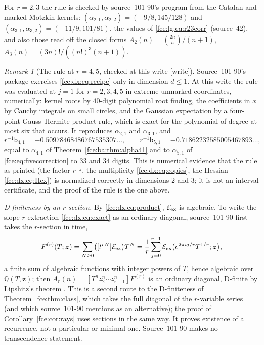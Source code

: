 \documentclass[11pt,a4paper]{article}
\numberwithin{equation}{section}
\theoremstyle{definition}\newtheorem{definition}[theorem]{Definition}
\theoremstyle{remark}\newtheorem{remark}[theorem]{Remark}
\newcommand{\Q}{\mathbb Q}
\newcommand{\E}{\mathcal E}
\begin{document}
For $r=2,3$ the rule is checked by source~101-90's program from the Catalan
and marked Motzkin kernels:
$(\alpha_{2,1},\alpha_{2,2})=(-9/8,145/128)$ and
$(\alpha_{3,1},\alpha_{3,2})=(-11/9,101/81)$, the values of
\eqref{fce:lg:eq:r23corr} (source~42), and also those read off the closed forms
$A_2(n)=\binom{2n}n/(n+1)$, $A_3(n)=(3n)!/((n!)^3(n+1))$.

\begin{remark}[The rule at $r=4,5$, checked at this write \textup{[write]}]\label{fce:dx:rem:recipecheck}
Source~101-90's package exercises \eqref{fce:dx:eq:recipe} only in dimension
$d\le1$. At this write the rule was evaluated at $j=1$ for $r=2,3,4,5$ in
extreme-unmarked coordinates, numerically: kernel roots by
$40$-digit polynomial root finding, the coefficients in $x$ by Cauchy
integrals on small circles, and the Gaussian expectation by a four-point
Gauss--Hermite product rule, which is exact for the polynomial of degree at
most six that occurs. It reproduces $\alpha_{2,1}$ and $\alpha_{3,1}$, and
\[
 r^{-1}\mathsf b_{4,1}=-0.50978468486767535307\ldots,\qquad
 r^{-1}\mathsf b_{5,1}=-0.71862232585005467893\ldots,
\]
equal to $\alpha_{4,1}$ of Theorem~\ref{fce:ba:thm:alpha41} and to
$\alpha_{5,1}$ of \eqref{fce:eq:fivecorrection} to $33$ and $34$ digits. This
is numerical evidence that the rule as printed (the factor $r^{-j}$, the
multiplicity \eqref{fce:dx:eq:copies}, the Hessian \eqref{fce:dx:eq:Hex}) is
normalized correctly in dimensions $2$ and $3$; it is not an interval
certificate, and the proof of the rule is the one above.
\end{remark}

\emph{D-finiteness by an $r$-section.} By \eqref{fce:dx:eq:product},
$\E_{\rm ex}$ is algebraic. To write the slope-$r$ extraction
\eqref{fce:dx:eq:exact} as an ordinary diagonal, source~101-90 first takes the
$r$-section in time,
\begin{equation}\label{fce:dx:eq:rsection}
 F^{(r)}(T;\boldsymbol z)=\sum_{N\ge0}\bigl([t^{rN}]\E_{\rm ex}\bigr)T^N
 =\frac1r\sum_{j=0}^{r-1}\E_{\rm ex}\bigl(e^{2\pi ij/r}T^{1/r};\boldsymbol z\bigr),
\end{equation}
a finite sum of algebraic functions with integer powers of $T$, hence
algebraic over $\Q(T,\boldsymbol z)$; then
$A_r(n)=[T^nz_2^n\cdots z_{r-1}^n]F^{(r)}$ is an ordinary diagonal, D-finite
by Lipshitz's theorem \cite{lipshitz}. This is a second route to the
D-finiteness of Theorem~\ref{fce:thm:class}, which takes the full diagonal of
the $r$-variable series (and which source~101-90 mentions as an
alternative); the proof of Corollary~\ref{fce:cor:rays} uses sections in the
same way. It proves existence of a recurrence, not a particular or minimal
one. Source~101-90 makes no transcendence statement.
\end{document}
